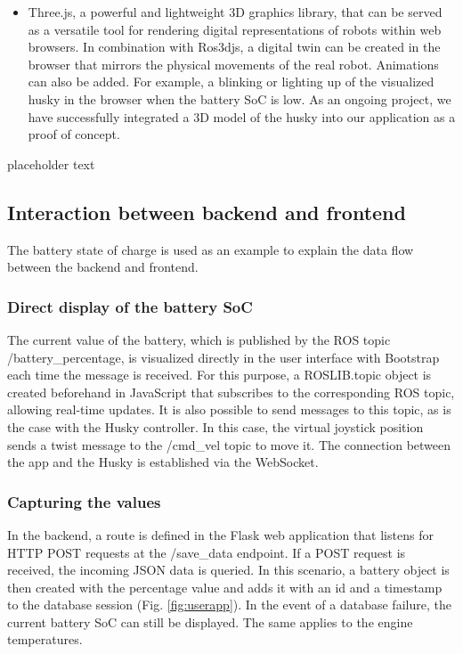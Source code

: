 \documentclass[conference]{IEEEtran}
\begin{document}
\begin{itemize}
\item Three.js, a powerful and lightweight 3D graphics library, that can be served as a versatile tool for rendering digital representations of robots within web browsers. In combination with Ros3djs, a digital twin can be created in the browser that mirrors the physical movements of the real robot. Animations can also be added. For example, a blinking or lighting up of the visualized husky in the browser when the battery SoC is low. 
As an ongoing project, we have successfully integrated a 3D model of the husky into our application as a proof of concept.
\end{itemize}
placeholder text

\subsection{Interaction between backend and frontend}
The battery state of charge is used as an example to explain the data flow between the backend and frontend. 
\subsubsection{Direct display of the battery SoC}
The current value of the battery, which is published by the ROS topic /battery\_percentage, is visualized directly in the user interface with Bootstrap each time the message is received. For this purpose, a ROSLIB.topic object is created beforehand in JavaScript that subscribes to the corresponding ROS topic, allowing real-time updates. It is also possible to send messages to this topic, as is the case with the Husky controller. 
In this case, the virtual joystick position sends a twist message to the /cmd\_vel topic to move it. 
The connection between the app and the Husky is established via the WebSocket. 
\subsubsection{Capturing the values}
In the backend, a route is defined in the Flask web application that listens for HTTP POST requests at the /save\_data endpoint. If a POST request is received, the incoming JSON data is queried. In this scenario, a battery object is then created with the percentage value and adds it with an id and a timestamp to the database session (Fig. \ref{fig:userapp}). In the event of a database failure, the current battery SoC can still be displayed. The same applies to the engine temperatures.
\end{document}
